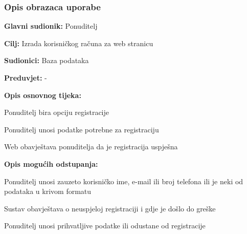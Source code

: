 				\subsubsection{Opis obrazaca uporabe}				
					\noindent {}
					\begin{packed_item}
	
						\item \textbf{Glavni sudionik: } Ponuditelj
						\item  \textbf{Cilj:} Izrada korisničkog računa za web stranicu
						\item  \textbf{Sudionici:} Baza podataka
						\item  \textbf{Preduvjet:} -
						\item  \textbf{Opis osnovnog tijeka:}
						
						\item[] \begin{packed_enum}
	
							\item Ponuditelj bira opciju registracije
                            				\item Ponuditelj unosi podatke potrebne za registraciju
							\item Web obavještava ponuditelja da je registracija uspješna
						\end{packed_enum}
						
						\item  \textbf{Opis mogućih odstupanja:}
						
						\item[] \begin{packed_item}
	
							\item[2.a] Ponuditelj unosi zauzeto korisničko ime, e-mail ili broj telefona ili je neki od podataka u krivom formatu
							\item[] \begin{packed_enum}
								
								\item Sustav obavještava o neuspjeloj registraciji i gdje je došlo do greške
								\item Ponuditelj unosi prihvatljive podatke ili odustane od registracije
								
							\end{packed_enum}
						\end{packed_item}
					\end{packed_item}

